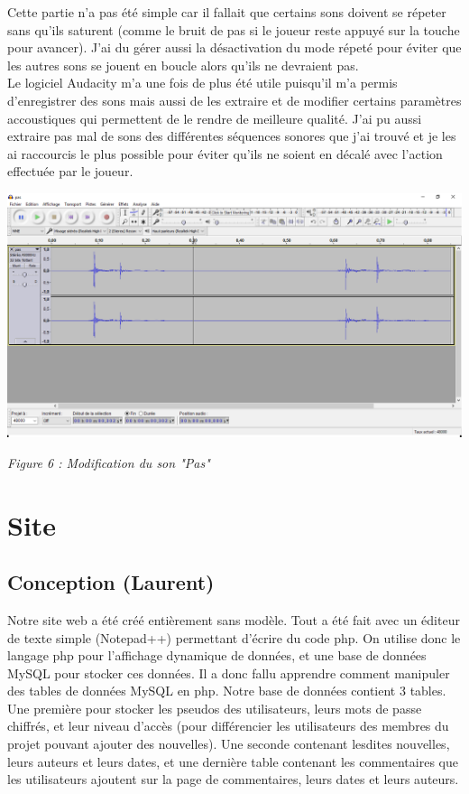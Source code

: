 \documentclass[a4paper , 12pt]{article}
\begin{document}
Cette partie n'a pas été simple car il fallait que certains sons doivent se répeter sans qu'ils saturent (comme le bruit de pas si le joueur reste appuyé sur la touche pour avancer). J'ai du gérer aussi la désactivation du mode répeté pour éviter que les autres sons se jouent en boucle alors qu'ils ne devraient pas.\\

Le logiciel Audacity m'a une fois de plus été utile puisqu'il m'a permis d'enregistrer des sons mais aussi de les extraire et de modifier certains paramètres accoustiques qui permettent de le rendre de meilleure qualité. J'ai pu aussi extraire pas mal de sons des différentes séquences sonores que j'ai trouvé et je les ai raccourcis le plus possible pour éviter qu'ils ne soient en décalé avec l'action effectuée par le joueur.

\quad

\begin{centering}


\includegraphics[scale = 0.35]{Audacity.png}

\textit{Figure 6 : Modification du son "Pas"}

\end{centering}

\newpage

\section{Site}


	\subsection{Conception (Laurent)}

	\quad

Notre site web a été créé entièrement sans modèle. Tout a été fait avec un éditeur de texte simple (Notepad++) permettant d’écrire du code php. On utilise donc le langage php pour l’affichage dynamique de données, et une base de données MySQL pour stocker ces données. Il a donc fallu apprendre comment manipuler des tables de données MySQL en php. Notre base de données contient 3 tables. Une première pour stocker les pseudos des utilisateurs, leurs mots de passe chiffrés, et leur niveau d'accès (pour différencier les utilisateurs des membres du projet pouvant ajouter des nouvelles). Une seconde contenant lesdites nouvelles, leurs auteurs et leurs dates, et une dernière table contenant les commentaires que les utilisateurs ajoutent sur la page de commentaires, leurs dates et leurs auteurs.
\end{document}
